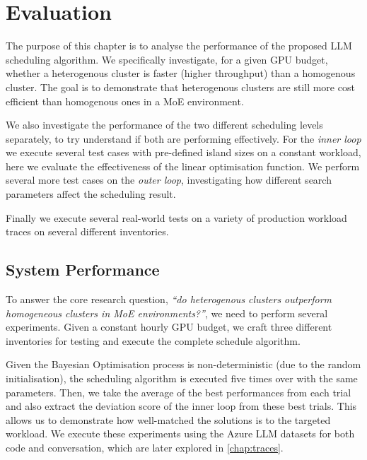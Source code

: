 \graphicspath{{chapters/05evaluation/graphs}}

\chapter{Evaluation}


The purpose of this chapter is to analyse the performance of the proposed LLM scheduling algorithm.
We specifically investigate, for a given GPU budget, whether a heterogenous cluster is faster (higher throughput) than a homogenous cluster.
The goal is to demonstrate that heterogenous clusters are still more cost efficient than homogenous ones in a MoE environment.

We also investigate the performance of the two different scheduling levels separately, to try understand if both are performing effectively.
For the \textit{inner loop} we execute several test cases with pre-defined island sizes on a constant workload, here we evaluate the effectiveness of the linear optimisation function.
We perform several more test cases on the \textit{outer loop}, investigating how different search parameters affect the scheduling result.

Finally we execute several real-world tests on a variety of production workload traces on several different inventories.

\section{System Performance}

To answer the core research question, \textit{``do heterogenous clusters outperform homogeneous clusters in MoE environments?''}, we need to perform several experiments.
Given a constant hourly GPU budget, we craft three different inventories for testing and execute the complete schedule algorithm.

Given the Bayesian Optimisation process is non-deterministic (due to the random initialisation), the scheduling algorithm is executed five times over with the same parameters.
Then, we take the average of the best performances from each trial and also extract the deviation score of the inner loop from these best trials.
This allows us to demonstrate how well-matched the solutions is to the targeted workload.
We execute these experiments using the Azure LLM \autocite{stojkovicDynamoLLMDesigningLLM2024} datasets for both code and conversation, which are later explored in \autoref{chap:traces}.

